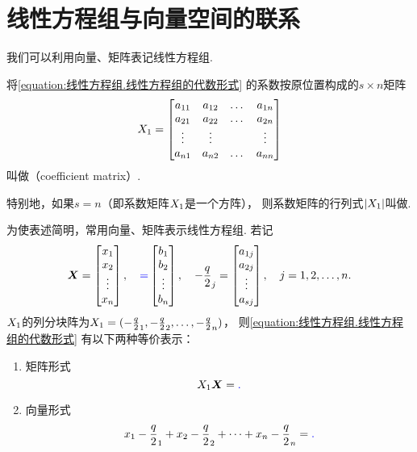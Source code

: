 \section{线性方程组与向量空间的联系}
我们可以利用向量、矩阵表记线性方程组.

\begin{definition}
将\cref{equation:线性方程组.线性方程组的代数形式} 的系数按原位置构成的\(s \times n\)矩阵\[
	X_1 = \begin{bmatrix}
		a_{11} & a_{12} & \dots & a_{1n} \\
		a_{21} & a_{22} & \dots & a_{2n} \\
		\vdots & \vdots & & \vdots \\
		a_{n1} & a_{n2} & \dots & a_{nn}
	\end{bmatrix}
\]叫做（coefficient matrix）.

特别地，如果\(s = n\)（即系数矩阵\(X_1\)是一个方阵），
则系数矩阵的行列式\(\abs{X_1}\)叫做.
\end{definition}

为使表述简明，常用向量、矩阵表示线性方程组.
若记\[
	\boldsymbol{X}=\begin{bmatrix}
		x_1 \\ x_2 \\ \vdots \\ x_n
	\end{bmatrix},
	\quad
	\textcolor{blue}=\begin{bmatrix}
		b_1 \\ b_2 \\ \vdots \\ b_n
	\end{bmatrix},
	\quad
	-\frac{q}{2}_j=\begin{bmatrix}
		a_{1j} \\ a_{2j} \\ \vdots \\ a_{sj}
	\end{bmatrix},
	\quad
	j=1,2,\dotsc,n.
\]
\(X_1\)的列分块阵为\(X_1 = (-\frac{q}{2}_1,-\frac{q}{2}_2,\dotsc,-\frac{q}{2}_n)\)，
则\cref{equation:线性方程组.线性方程组的代数形式} 有以下两种等价表示：
\begin{enumerate}
	\item 矩阵形式\[
		X_1 \boldsymbol{X} = \textcolor{blue}.
	\]
	\item 向量形式\[
		x_1 -\frac{q}{2}_1 + x_2 -\frac{q}{2}_2 + \dotsb + x_n -\frac{q}{2}_n = \textcolor{blue}.
	\]
\end{enumerate}







